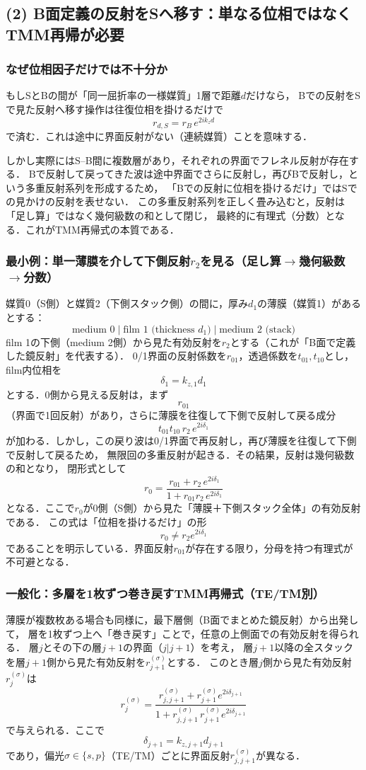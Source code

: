 \subsection{(2) B面定義の反射をSへ移す：単なる位相ではなくTMM再帰が必要}

\subsubsection{なぜ位相因子だけでは不十分か}
もしSとBの間が「同一屈折率の一様媒質」1層で距離$d$だけなら，
Bでの反射をSで見た反射へ移す操作は往復位相を掛けるだけで
\[
r_{d,S} = r_B\,e^{2 i k_{z} d}
\]
で済む．これは途中に界面反射がない（連続媒質）ことを意味する．

しかし実際にはS--B間に複数層があり，それぞれの界面でフレネル反射が存在する．
Bで反射して戻ってきた波は途中界面でさらに反射し，再びBで反射し，という多重反射系列を形成するため，
「Bでの反射に位相を掛けるだけ」ではSでの見かけの反射を表せない．
この多重反射系列を正しく畳み込むと，反射は「足し算」ではなく幾何級数の和として閉じ，
最終的に有理式（分数）となる．これがTMM再帰式の本質である．

\subsubsection{最小例：単一薄膜を介して下側反射$r_2$を見る（足し算$\to$幾何級数$\to$分数）}
媒質0（S側）と媒質2（下側スタック側）の間に，厚み$d_1$の薄膜（媒質1）があるとする：
\[
\text{medium 0}\;|\;\text{film 1 (thickness }d_1)\;|\;\text{medium 2 (stack)}
\]
film 1の下側（medium 2側）から見た有効反射を$r_2$とする（これが「B面で定義した鏡反射」を代表する）．
0/1界面の反射係数を$r_{01}$，透過係数を$t_{01},t_{10}$とし，
film内位相を
\[
\delta_1 = k_{z,1} d_1
\]
とする．0側から見える反射は，まず
\[
r_{01}
\]
（界面で1回反射）があり，さらに薄膜を往復して下側で反射して戻る成分
\[
t_{01}t_{10}\,r_2\,e^{2i\delta_1}
\]
が加わる．しかし，この戻り波は0/1界面で再反射し，再び薄膜を往復して下側で反射して戻るため，
無限回の多重反射が起きる．その結果，反射は幾何級数の和となり，
閉形式として
\[
\boxed{
r_0
=
\frac{r_{01}+r_2\,e^{2i\delta_1}}
{1+r_{01}r_2\,e^{2i\delta_1}}
}
\]
となる．ここで$r_0$が0側（S側）から見た「薄膜＋下側スタック全体」の有効反射である．
この式は「位相を掛けるだけ」の形
\[
r_0 \neq r_2 e^{2i\delta_1}
\]
であることを明示している．界面反射$r_{01}$が存在する限り，分母を持つ有理式が不可避となる．

\subsubsection{一般化：多層を1枚ずつ巻き戻すTMM再帰式（TE/TM別）}
薄膜が複数枚ある場合も同様に，最下層側（B面でまとめた鏡反射）から出発して，
層を1枚ずつ上へ「巻き戻す」ことで，任意の上側面での有効反射を得られる．
層$j$とその下の層$j+1$の界面（$j|j+1$）を考え，
層$j+1$以降の全スタックを層$j+1$側から見た有効反射を$r_{j+1}^{(\sigma)}$とする．
このとき層$j$側から見た有効反射$r_j^{(\sigma)}$は
\[
\boxed{
r_j^{(\sigma)}
=
\frac{
r_{j,j+1}^{(\sigma)} + r_{j+1}^{(\sigma)} e^{2i\delta_{j+1}}
}{
1 + r_{j,j+1}^{(\sigma)}\, r_{j+1}^{(\sigma)} e^{2i\delta_{j+1}}
}
}
\]
で与えられる．ここで
\[
\delta_{j+1} = k_{z,j+1} d_{j+1}
\]
であり，偏光$\sigma\in\{s,p\}$（TE/TM）ごとに界面反射$r_{j,j+1}^{(\sigma)}$が異なる．

